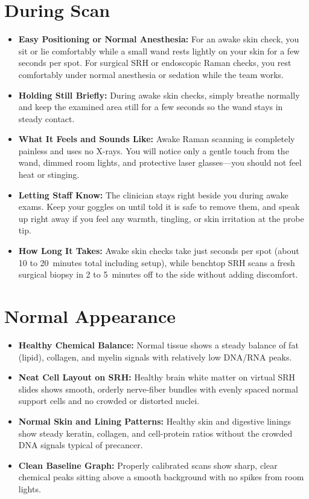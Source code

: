 \section{During Scan}
\begin{itemize}
  \item \textbf{Easy Positioning or Normal Anesthesia:} For an awake skin check, you sit or lie comfortably while a small wand rests lightly on your skin for a few seconds per spot. For surgical SRH or endoscopic Raman checks, you rest comfortably under normal anesthesia or sedation while the team works.
  \item \textbf{Holding Still Briefly:} During awake skin checks, simply breathe normally and keep the examined area still for a few seconds so the wand stays in steady contact.
  \item \textbf{What It Feels and Sounds Like:} Awake Raman scanning is completely painless and uses no X-rays. You will notice only a gentle touch from the wand, dimmed room lights, and protective laser glasses---you should not feel heat or stinging.
  \item \textbf{Letting Staff Know:} The clinician stays right beside you during awake exams. Keep your goggles on until told it is safe to remove them, and speak up right away if you feel any warmth, tingling, or skin irritation at the probe tip.
  \item \textbf{How Long It Takes:} Awake skin checks take just seconds per spot (about 10 to 20~minutes total including setup), while benchtop SRH scans a fresh surgical biopsy in 2 to 5~minutes off to the side without adding discomfort.
\end{itemize}

\section{Normal Appearance}
\begin{itemize}
  \item \textbf{Healthy Chemical Balance:} Normal tissue shows a steady balance of fat (lipid), collagen, and myelin signals with relatively low DNA/RNA peaks.
  \item \textbf{Neat Cell Layout on SRH:} Healthy brain white matter on virtual SRH slides shows smooth, orderly nerve-fiber bundles with evenly spaced normal support cells and no crowded or distorted nuclei.
  \item \textbf{Normal Skin and Lining Patterns:} Healthy skin and digestive linings show steady keratin, collagen, and cell-protein ratios without the crowded DNA signals typical of precancer.
  \item \textbf{Clean Baseline Graph:} Properly calibrated scans show sharp, clear chemical peaks sitting above a smooth background with no spikes from room lights.
\end{itemize}

